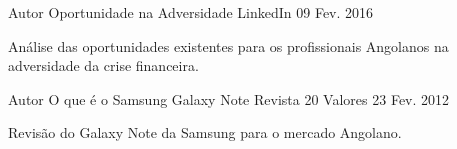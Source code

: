 


\begin{cventries}


\cventry
{Autor} %
{Oportunidade na Adversidade} %
{LinkedIn} %
{09 Fev. 2016} %
{ %
\begin{cvitems}
\item {Análise das oportunidades existentes para os profissionais Angolanos na adversidade da crise financeira.}
\end{cvitems}
}


\cventry
{Autor} %
{O que é o Samsung Galaxy Note} %
{Revista 20 Valores} %
{23 Fev. 2012} %
{ %
\begin{cvitems}
\item {Revisão do Galaxy Note da Samsung para o mercado Angolano.}
\end{cvitems}
}



\end{cventries}
